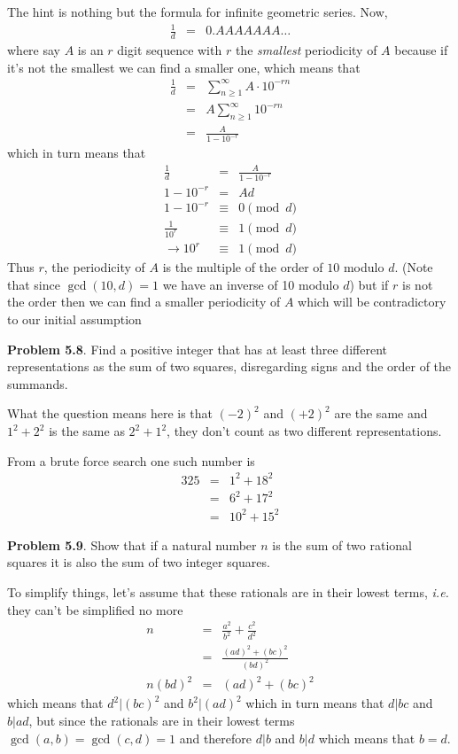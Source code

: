 \documentclass[aps,preprint,preprintnumbers,nofootinbib,showpacs,prd]{revtex4-1}
\newcommand{\ie}{{\it i.e.} }
\newcommand{\nbea}{\begin{eqnarray*}}
\newcommand{\neea}{\end{eqnarray*}}
\begin{document}
The hint is nothing but the formula for infinite geometric series. Now,
%
\nbea
\frac{1}{d} & = & 0.AAAAAAA\dots
\neea
%
where say $A$ is an $r$ digit sequence with $r$ the {\it smallest} periodicity of $A$ because if it's not the smallest we can find a smaller one, which means that
%
\nbea
\frac{1}{d} & = & \sum_{n \ge 1}^{\infty} A \cdot 10^{-rn} \\
& = & A \sum_{n \ge 1}^{\infty} 10^{-rn} \\
& = & \frac{A}{1-10^{-r}}
\neea
%
which in turn means that
%
\nbea
\frac{1}{d} & = & \frac{A}{1-10^{-r}} \\
1-10^{-r} & = & Ad \\
1-10^{-r} & \equiv & 0 \pmod{d} \\
\frac{1}{10^r} & \equiv & 1 \pmod{d} \\
\to 10^r & \equiv & 1 \pmod{d}
\neea
%
Thus $r$, the periodicity of $A$ is the multiple of the order of $10$ modulo $d$. (Note that since $\gcd(10,d) = 1$ we have an inverse of 10 modulo $d$) but if $r$ is not the order then we can find a smaller periodicity of $A$ which will be contradictory to our initial assumption

{\bf Problem 5.8}. Find a positive integer that has at least three different representations
as the sum of two squares, disregarding signs and the order of the summands.

What the question means here is that $(-2)^2$ and $(+2)^2$ are the same and $1^2 + 2^2$ is the same as $2^2 + 1^2$, they don't count as two different representations.

From a brute force search one such number is
%
\nbea
325 & = & 1^2 + 18^2 \\
& = & 6^2 + 17^2 \\
& = & 10^2 + 15^2
\neea
%

{\bf Problem 5.9}. Show that if a natural number $n$ is the sum of two rational squares
it is also the sum of two integer squares.

To simplify things, let's assume that these rationals are in their lowest terms, \ie they can't be simplified no more
%
\nbea
n & = & \frac{a^2}{b^2} + \frac{c^2}{d^2} \\
& = & \frac{(ad)^2 + (bc)^2}{(bd)^2} \\
n(bd)^2 & = & (ad)^2 + (bc)^2
\neea
%
which means that $d^2|(bc)^2$ and $b^2|(ad)^2$ which in turn means that $d|bc$ and $b|ad$, but since the rationals are in their lowest terms $\gcd(a,b) = \gcd(c,d) = 1$ and therefore $d|b$ and $b|d$ which means that $b = d$.
\end{document}
